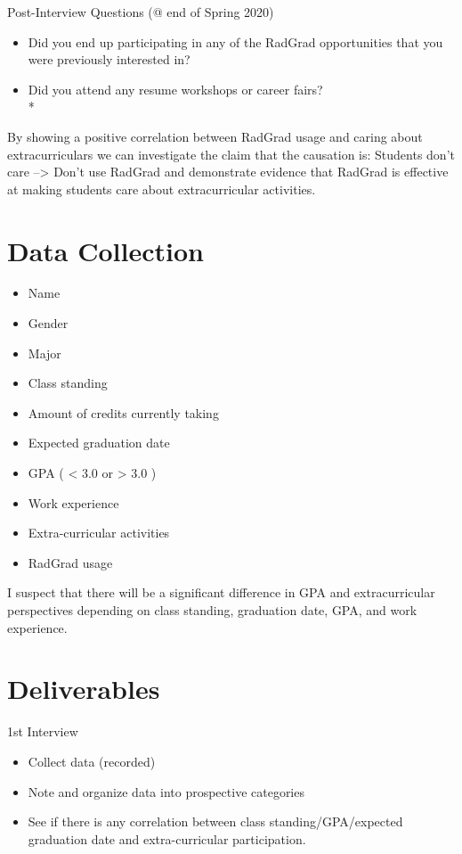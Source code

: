 \documentclass[english]{proposalnsf}
\begin{document}
  Post-Interview Questions (@ end of Spring 2020)
  \begin{itemize}
    \item Did you end up participating in any of the RadGrad opportunities that you were previously interested in?
    \item Did you attend any resume workshops or career fairs?\\*
  \end{itemize}

  By showing a positive correlation between RadGrad usage and caring about extracurriculars we can investigate the claim that the causation is:
  Students don't care --> Don't use RadGrad
  and demonstrate evidence that RadGrad is effective at making students care about extracurricular activities.

  \section{Data Collection}
  \label{data-collection}

  \begin{itemize}
    \item Name
    \item Gender
    \item Major
    \item Class standing
    \item Amount of credits currently taking
    \item Expected graduation date
    \item GPA ( < 3.0 or > 3.0 )
    \item Work experience
    \item Extra-curricular activities
    \item RadGrad usage
  \end{itemize}

  I suspect that there will be a significant difference in GPA and extracurricular perspectives depending on class standing, graduation date, GPA, and work experience.

  \section{Deliverables}
  \label{deliverables}

  1st Interview
  \begin{itemize}
    \item Collect data (recorded)
    \item Note and organize data into prospective categories
    \item See if there is any correlation between class standing/GPA/expected graduation date and extra-curricular participation. \\
  \end{itemize}
\end{document}
